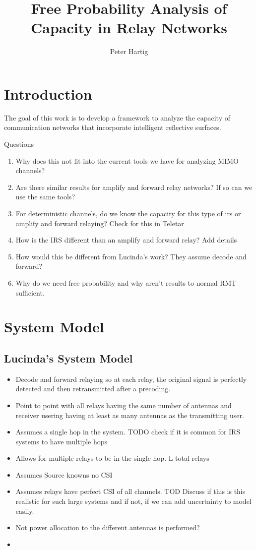 \documentclass[12pt,a4paper]{article}
\title{Free Probability Analysis of Capacity in Relay Networks}
\author{Peter Hartig}
\begin{document}
\maketitle
\chapter{Introduction}
The goal of this work is to develop a framework to analyze the capacity of communication networks that incorporate intelligent reflective surfaces. 
\par
Questions
\begin{enumerate}
\item Why does this not fit into the current tools we have for analyzing MIMO channels?
\item Are there similar results for amplify and forward relay networks? If so can we use the same tools?
\item For deterministic channels, do we know the capacity for this type of irs or amplify and forward relaying?
Check for this in Teletar
\item How is the IRS different than an amplify and forward relay? Add details 
\item How would this be different from Lucinda's work? 
They assume decode and forward?
\item Why do we need free probability and why aren't results to normal RMT sufficient.
\end{enumerate}
\chapter{System Model}
\section{Lucinda's System Model}
\begin{itemize}
\item Decode and forward relaying so at each relay, the original signal is perfectly detected and then retransmitted after a precoding. 
\item Point to point with all relays having the same number of antennas and receiver usering having at least as many antennas as the transmitting user.
\item Assumes a single hop in the system. TODO check if it is common for IRS systems to have multiple hops
\item Allows for multiple relays to be in the single hop. L total relays
\item Assumes Source knowns no CSI
\item Assumes relays have perfect CSI of all channels. TOD Discuss if this is this realistic for such large systems and if not, if we can add uncertainty to model easily.
\item Not power allocation to the different antennas is performed?
\item 
\end{itemize}
\end{document}
